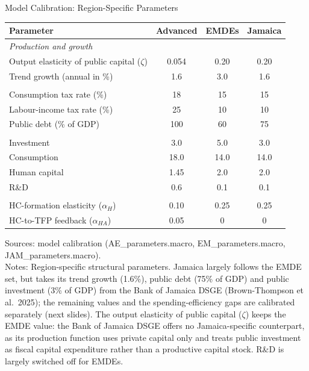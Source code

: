 \documentclass[aspectratio=169, 11pt, t]{beamer}
\begin{document}
\begin{frame}{Model Calibration: Region-Specific Parameters}\label{slide:params}
    \vspace{-0.4em}
    \begin{center}
    \scriptsize
    \renewcommand{\arraystretch}{1.0}
    \begin{tabular}{l c c c}
        \toprule
        Parameter & Advanced & EMDEs & Jamaica \\
        \midrule
        \multicolumn{4}{l}{\textit{Production and growth}} \\
        \quad Output elasticity of public capital ($\zeta$) & 0.054 & 0.20 & 0.20 \\
        \quad Trend growth (annual in \%) & 1.6 & 3.0 & 1.6 \\
        \addlinespace[0.1em]
        \multicolumn{4}{l}{\textit{Fiscal}} \\
        \quad Consumption tax rate (\%) & 18 & 15 & 15 \\
        \quad Labour-income tax rate (\%) & 25 & 10 & 10 \\
        \quad Public debt (\% of GDP) & 100 & 60 & 75 \\
        \addlinespace[0.1em]
        \multicolumn{4}{l}{\textit{Public spending (\% of GDP)}} \\
        \quad Investment & 3.0 & 5.0 & 3.0 \\
        \quad Consumption & 18.0 & 14.0 & 14.0 \\
        \quad Human capital & 1.45 & 2.0 & 2.0 \\
        \quad R\&D & 0.6 & 0.1 & 0.1 \\
        \addlinespace[0.1em]
        \multicolumn{4}{l}{\textit{Human capital}} \\
        \quad HC-formation elasticity ($\alpha_H$) & 0.10 & 0.25 & 0.25 \\
        \quad HC-to-TFP feedback ($\alpha_{HA}$) & 0.05 & 0 & 0 \\
        \bottomrule
    \end{tabular}
    \end{center}

    \vspace{0.3em}
    {\fontsize{6pt}{7.5pt}\selectfont
        Sources: model calibration (AE\_parameters.macro, EM\_parameters.macro, JAM\_parameters.macro). \\
        Notes: Region-specific structural parameters. Jamaica largely follows the EMDE set, but takes its trend growth (1.6\%), public debt (75\% of GDP) and public investment (3\% of GDP) from the Bank of Jamaica DSGE (Brown-Thompson et al.\ 2025); the remaining values and the spending-efficiency gaps are calibrated separately (next slides). The output elasticity of public capital ($\zeta$) keeps the EMDE value: the Bank of Jamaica DSGE offers no Jamaica-specific counterpart, as its production function uses private capital only and treats public investment as fiscal capital expenditure rather than a productive capital stock. R\&D is largely switched off for EMDEs. \\
    }
\end{frame}
\end{document}
